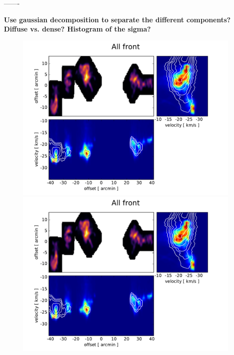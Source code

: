 \documentclass[traditabstract]{aa}
\begin{document}
-------

\textbf{Use gaussian decomposition to separate the different components? Diffuse vs. dense? Histogram of the sigma?}


\begin{figure}[h]
  \centering
  \includegraphics[page=5,width=14cm,trim=30 10 55 30,clip=true]{Figures/PV_diagrams_CO.pdf} \\
  \includegraphics[page=4,width=14cm,trim=30 10 55 30,clip=true]{Figures/PV_diagrams_CO.pdf}
  \caption{}
\end{figure}
\end{document}
